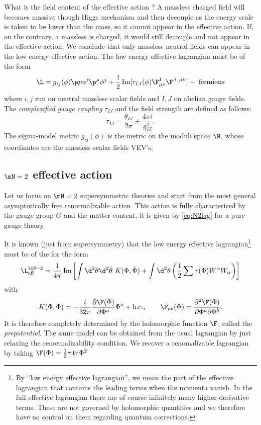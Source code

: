 \documentclass{worksheetclass}
\begin{document}
        What is the field content of the effective action ? A massless charged field will becomes massive though Higgs mechanism and then decouple as the energy scale is taken to be lower than the mass, so it cannot appear in the effective action. If, on the contrary, a massless is charged, it would still decouple and not appear in the effective action. We conclude that only massless neutral fields can appear in the low energy effective action. The low energy effective lagrangian must be of the form
        \begin{equation}
            \L = g_{ij}(\phi)\p\mu\phi^i\p^\mu\phi^j+\frac{1}{2}\Im[\tau_{IJ}(\phi)\F^I_{\mu\nu}\F^{J~\mu\nu}]+\text{ fermions}
        \end{equation}
        where $i,j$ run on neutral massless scalar fields and $I,J$ on abelian gauge fields. The \emph{complexified gauge coupling} $\tau_{IJ}$ and the field strength are defined as follows:
        \begin{equation}
            \tau_{IJ}=\frac{\theta_{IJ}}{2\pi}+\frac{4\pi i}{g^2_{IJ}}.
        \end{equation}
        The sigma-model metric $g_{ij}(\phi)$ is the metric on the moduli space $\M$, whose coordinates are the massless scalar fields VEV's.

    \subsection{$\mN=2$ effective action}

        Let us focus on $\mN=2$ supersymmetric theories and start from the most general asymptotically free renormalizable action. This action is fully characterized by the gauge group $G$ and the matter content, it is given by \eqref{eq:N2lag} for a pure gauge theory.

        It is known (just from supersymmetry) that the low energy effective lagrangian\footnote{By ``low energy effective lagrangian'', we mean the part of the effective lagrangian that contains the leading terms when the momenta vanish. In the full effective lagrangian there are of course infinitely many higher derivative terms. These are not governed by holomorphic quantities and we therefore have no control on them regarding quantum corrections.} must be of the for the form
        \begin{equation}
            \L^{\mN=2}_{\text{eff}} = \frac{1}{4\pi}\Im\left[\int\d^2\theta\d^2\bar{\theta}~K(\Phi,\bar{\Phi})+\int\d^2\theta\left(\frac{1}{2}\sum\tau(\Phi)W^\alpha W_\alpha\right)\right]
        \end{equation}
        with
        \begin{equation}
            K(\Phi,\bar{\Phi})=-\frac{i}{32\pi}\pdv{\F(\Phi)}{\Phi^a}\bar{\Phi}^a+\text{h.c.},\qquad \F_{ab}(\Phi)=\pdv{\F(\Phi)}{\Phi^a}{\Phi^b}.\label{eq:effectivelagftcs}
        \end{equation}
        It is therefore completely determined by the holomorphic function $\F$, called the \emph{prepotential}. The same model can be obtained from the usual lagrangian by just relaxing the renormalizability condition. We recover a renomalizable lagrangian by taking $\F(\Phi)=\frac{1}{2}\tau\tr\Phi^2$
\end{document}
